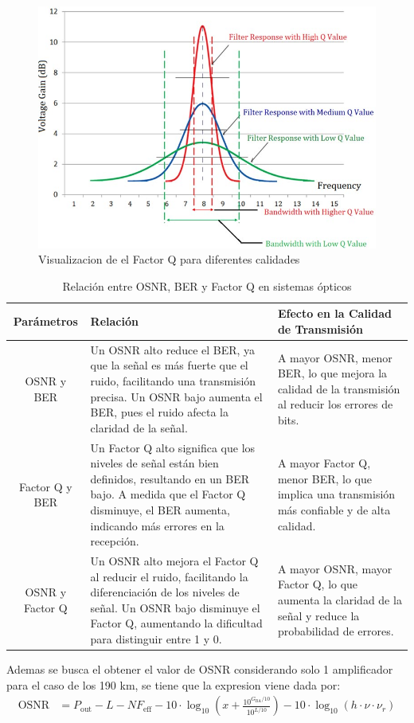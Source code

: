 \begin{enumerate}
\begin{itemize}
\begin{figure}
				\centering
				\includegraphics[width=0.5\linewidth]{img/Figure_5_1}
				\caption{Visualizacion de el Factor Q para diferentes calidades}
				\label{fig:7}
			\end{figure}
			\begin{table}[H]
				\centering
				\begin{tabular}{|c|p{5cm}|p{5cm}|}
				\hline
				\textbf{Parámetros} & \textbf{Relación} & \textbf{Efecto en la Calidad de Transmisión} \\
				\hline
				OSNR y BER & Un OSNR alto reduce el BER, ya que la señal es más fuerte que el ruido, facilitando una transmisión precisa. Un OSNR bajo aumenta el BER, pues el ruido afecta la claridad de la señal. & A mayor OSNR, menor BER, lo que mejora la calidad de la transmisión al reducir los errores de bits. \\
				\hline
				Factor Q y BER & Un Factor Q alto significa que los niveles de señal están bien definidos, resultando en un BER bajo. A medida que el Factor Q disminuye, el BER aumenta, indicando más errores en la recepción. & A mayor Factor Q, menor BER, lo que implica una transmisión más confiable y de alta calidad. \\
				\hline
				OSNR y Factor Q & Un OSNR alto mejora el Factor Q al reducir el ruido, facilitando la diferenciación de los niveles de señal. Un OSNR bajo disminuye el Factor Q, aumentando la dificultad para distinguir entre 1 y 0. & A mayor OSNR, mayor Factor Q, lo que aumenta la claridad de la señal y reduce la probabilidad de errores. \\
				\hline
				\end{tabular}
				\caption{Relación entre OSNR, BER y Factor Q en sistemas ópticos}
				\end{table}
		\end{itemize}
		Ademas se busca el obtener el valor de OSNR considerando solo 1 amplificador para el caso de los 190 km, se tiene que la expresion viene dada por:
		\begin{align}
			\text{OSNR} &= P_{\text{out}} - L - NF_{\text{eff}} - 10 \cdot \log_{10} \left( x + \frac{10^{G_{\text{BA}}/10}}{10^{L/10}} \right) - 10 \cdot \log_{10}(h \cdot \nu \cdot \nu_r) 

\end{align}
\end{enumerate}
